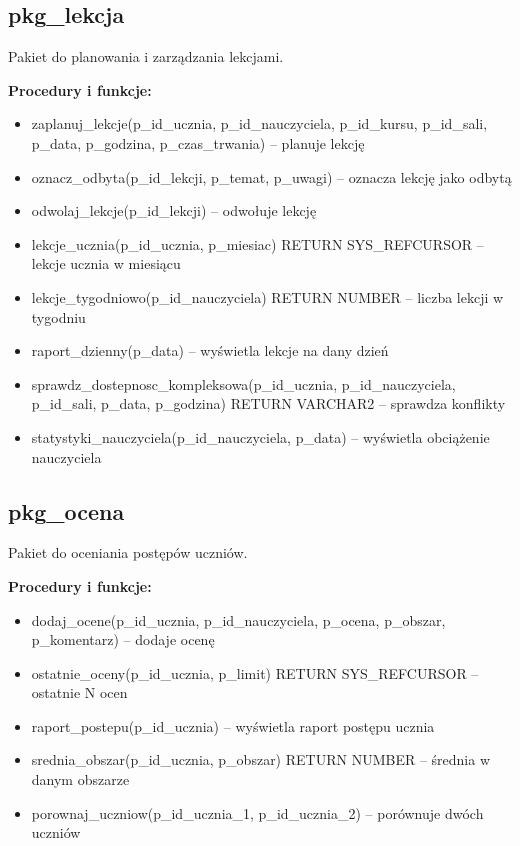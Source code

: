 \documentclass[12pt,a4paper]{article}
\begin{document}
\subsection{pkg\_lekcja}
Pakiet do planowania i zarządzania lekcjami.

\textbf{Procedury i funkcje:}
\begin{itemize}[nosep]
    \item zaplanuj\_lekcje(p\_id\_ucznia, p\_id\_nauczyciela, p\_id\_kursu, p\_id\_sali, p\_data, p\_godzina, p\_czas\_trwania) -- planuje lekcję
    \item oznacz\_odbyta(p\_id\_lekcji, p\_temat, p\_uwagi) -- oznacza lekcję jako odbytą
    \item odwolaj\_lekcje(p\_id\_lekcji) -- odwołuje lekcję
    \item lekcje\_ucznia(p\_id\_ucznia, p\_miesiac) RETURN SYS\_REFCURSOR -- lekcje ucznia w miesiącu
    \item lekcje\_tygodniowo(p\_id\_nauczyciela) RETURN NUMBER -- liczba lekcji w tygodniu
    \item raport\_dzienny(p\_data) -- wyświetla lekcje na dany dzień
    \item sprawdz\_dostepnosc\_kompleksowa(p\_id\_ucznia, p\_id\_nauczyciela, p\_id\_sali, p\_data, p\_godzina) RETURN VARCHAR2 -- sprawdza konflikty
    \item statystyki\_nauczyciela(p\_id\_nauczyciela, p\_data) -- wyświetla obciążenie nauczyciela
\end{itemize}

\subsection{pkg\_ocena}
Pakiet do oceniania postępów uczniów.

\textbf{Procedury i funkcje:}
\begin{itemize}[nosep]
    \item dodaj\_ocene(p\_id\_ucznia, p\_id\_nauczyciela, p\_ocena, p\_obszar, p\_komentarz) -- dodaje ocenę
    \item ostatnie\_oceny(p\_id\_ucznia, p\_limit) RETURN SYS\_REFCURSOR -- ostatnie N ocen
    \item raport\_postepu(p\_id\_ucznia) -- wyświetla raport postępu ucznia
    \item srednia\_obszar(p\_id\_ucznia, p\_obszar) RETURN NUMBER -- średnia w danym obszarze
    \item porownaj\_uczniow(p\_id\_ucznia\_1, p\_id\_ucznia\_2) -- porównuje dwóch uczniów
\end{itemize}
\end{document}
